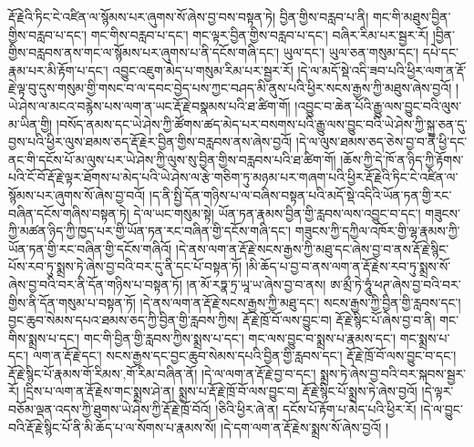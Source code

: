 རྡོ་རྗེའི་ཏིང་ངེ་འཛིན་ལ་སྙོམས་པར་ཞུགས་སོ་ཞེས་བྱ་བས་བསྟན་ཏེ། བྱིན་གྱིས་བརླབ་པ་ནི། གང་གི་མཐུས་བྱིན་གྱིས་བརླབ་པ་དང་། གང་གིས་བརླབ་པ་དང་། གང་ལྟར་བྱིན་གྱིས་བརླབ་པ་དང་། བཞིར་རིམ་པར་སྦྱར་རོ། །བྱིན་གྱིས་བརླབས་ནས་གང་ལ་སྙོམས་པར་ཞུགས་པ་ནི་དངོས་གཞི་དང་། ཡུལ་དང་། ཡུལ་ཅན་གསུམ་དང་། དཔེ་དང་རྣམ་པར་མི་རྟོག་པ་དང་། འབྱུང་འཇུག་མེད་པ་གསུམ་རིམ་པར་སྦྱར་རོ། །དེ་ལ་མདོ་སྡེ་འདི་ཟབ་པའི་ཕྱིར་ལག་ན་རྡོ་རྗེ་ལྟ་བུ་དུས་གསུམ་གྱི་གསང་བ་ལ་དབང་བྱེད་པས་ཀྱང་བཤད་མི་ནུས་པའི་ཕྱིར་སངས་རྒྱས་ཀྱི་མཐུས་ཞེས་བྱའོ། །ཡེ་ཤེས་ལ་མངའ་བརྙེས་པས་ལག་ན་ཡང་རྡོ་རྗེ་བསྣམས་པའི་ཐ་ཚིག་གོ། །འབྱུང་བ་ཆེན་པོའི་རྒྱུ་ལས་བྱུང་བའི་ལུས་མ་ཡིན་གྱི། །བསོད་ནམས་དང་ཡེ་ཤེས་ཀྱི་ཚོགས་ཚད་མེད་པར་བསགས་པའི་རྒྱུ་ལས་བྱུང་བའི་ཡེ་ཤེས་ཀྱི་སྐུ་ཅན་དུ་བྱས་པའི་ཕྱིར་ལུས་ཐམས་ཅད་རྡོ་རྗེར་བྱིན་གྱིས་བརླབས་ནས་ཞེས་བྱའོ། །དེ་ལ་ལུས་ཐམས་ཅད་ཅེས་བྱ་བ་ནི་ཕྱི་དང་ནང་གི་དངོས་པོ་མ་ལུས་པར་ཡེ་ཤེས་ཀྱི་ལུས་སུ་བྱིན་གྱིས་བརླབས་པའི་ཐ་ཚིག་གོ། །ཆོས་ཀྱི་དེ་ཁོ་ན་ཉིད་ཀྱི་རྟོགས་པའི་ངོ་བོ་རྡོ་རྗེ་ལྟར་ཐོགས་པ་མེད་པའི་ཡེ་ཤེས་ལ་རྩེ་གཅིག་ཏུ་མཉམ་པར་གཞག་པའི་ཕྱིར་རྡོ་རྗེའི་ཏིང་ངེ་འཛིན་ལ་སྙོམས་པར་ཞུགས་སོ་ཞེས་བྱ་བའོ། །ད་ནི་སྤྱི་དོན་གཉིས་པ་ལ་བཞིས་བསྟན་པའི་མདོ་སྡེ་འདིའི་ཡོན་ཏན་གྱི་རང་བཞིན་དངོས་གཞིས་བསྟན་ཏེ། དེ་ལ་ཡང་གསུམ་སྟེ། ཡོན་ཏན་རྣམས་བྱིན་གྱི་རླབས་ལས་འབྱུང་བ་དང་། གཟུངས་ཀྱི་མཚན་ཉིད་ཀྱི་ཁྱད་པར་གྱི་ཡོན་ཏན་རང་བཞིན་གྱི་དངོས་གཞི་དང་། གཟུངས་ཀྱི་དཀྱིལ་འཁོར་གྱི་ལྷ་རྣམས་ཀྱི་ཡོན་ཏན་གྱི་རང་བཞིན་གྱི་དངོས་གཞིའོ། །དེ་ནས་ལག་ན་རྡོ་རྗེ་སངས་རྒྱས་ཀྱི་མཐུ་དང་ཞེས་བྱ་བ་ནས་རྡོ་རྗེ་སྙིང་པོས་རབ་ཏུ་སྨྲས་ཏེ་ཞེས་བྱ་བའི་བར་དུ་ནི་དང་པོ་བསྟན་ཏོ། །མི་ཆོད་པ་བྱ་བ་ནས་ལག་ན་རྡོ་རྗེས་རབ་ཏུ་སྨྲས་སོ་ཞེས་བྱ་བའི་བར་ནི་དོན་གཉིས་པ་བསྟན་ཏོ། །ན་མོ་རཏྣ་ཏྲ་ཡཱ་ཡ་ཞེས་བྱ་བ་ནས། ཨ་མྲྀ་ཏེ་ཧཱུཾ་ཕཊ་ཞེས་བྱ་བའི་བར་གྱིས་ནི་དོན་གསུམ་པ་བསྟན་ཏོ། །དེ་ནས་ལག་ན་རྡོ་རྗེ་སངས་རྒྱས་ཀྱི་མཐུ་དང་། སངས་རྒྱས་ཀྱི་བྱིན་གྱི་རླབས་དང་། བྱང་ཆུབ་སེམས་དཔའ་ཐམས་ཅད་ཀྱི་བྱིན་གྱི་རླབས་ཀྱིས། རྡོ་རྗེ་ཁྲོ་བོ་ལས་བྱུང་བ། རྡོ་རྗེ་སྙིང་པོ་ཞེས་བྱ་བ་ནི། གང་གིས་སྨྲས་པ་དང་། གང་གི་བྱིན་གྱི་རླབས་ཀྱིས་སྨྲས་པ་དང་། གང་ལས་བྱུང་བ་སྨྲས་པ་རྣམས་དང་། གང་སྨྲས་པ་དང་། ལག་ན་རྡོ་རྗེ་དང་། སངས་རྒྱས་དང་བྱང་ཆུབ་སེམས་དཔའི་བྱིན་གྱི་རླབས་དང་། རྡོ་རྗེ་ཁྲོ་བོ་ལས་བྱུང་བ་དང་། རྡོ་རྗེ་སྙིང་པོ་རྣམས་{གོ་རིམས་,གོ་རིམ་}བཞིན་ནོ། །དེ་ལ་ལག་ན་རྡོ་རྗེ་བྱ་བ་དང་། སྨྲས་ཏེ་ཞེས་བྱ་བའི་བར་སྐབས་སྦྱར་རོ། །དྲིས་པ་ལག་ན་རྡོ་རྗེས་གང་སྨྲས་ཤེ་ན། སྨྲས་པ་རྡོ་རྗེ་ཁྲོ་བོ་ལས་བྱུང་བ། རྡོ་རྗེ་སྙིང་པོ་སྨྲས་ཏེ་ཞེས་བྱའོ། །དེ་ལྟར་བཅོམ་ལྡན་འདས་ཀྱི་ཐུགས་ཡེ་ཤེས་ཀྱི་རྡོ་རྗེ་ཁྲོ་བོའོ། །ཅིའི་ཕྱིར་ཞེ་ན། དངོས་པོ་རྟོག་པ་མེད་པའི་ཕྱིར་རོ། །དེ་ལ་བྱུང་བའི་རྡོ་རྗེ་སྙིང་པོ་ནི་མི་ཆོད་པ་ལ་སོགས་པ་རྣམས་སོ། །དེ་དག་ལག་ན་རྡོ་རྗེས་སྨྲས་སོ་ཞེས་བྱའོ། །
